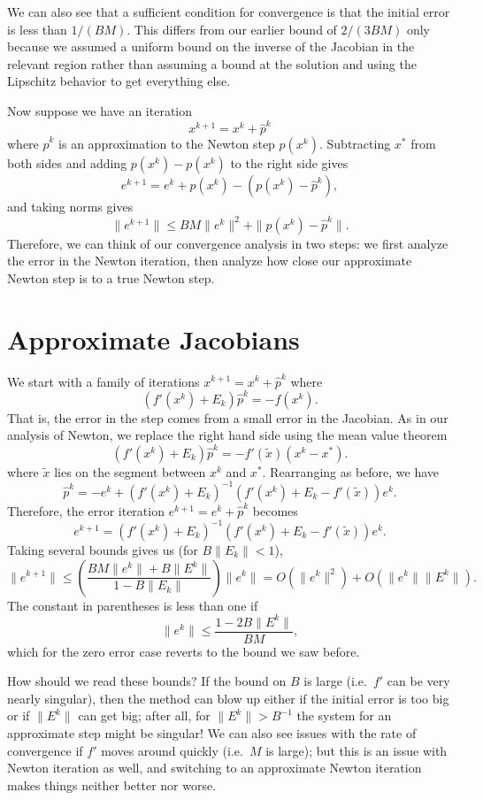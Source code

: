\documentclass[12pt, leqno]{article} %
\begin{document}
We can also see that a sufficient condition for convergence is that
the initial error is less than $1/(BM)$.  This differs from our
earlier bound of $2/(3BM)$ only because we assumed a uniform bound on
the inverse of the Jacobian in the relevant region rather than
assuming a bound at the solution and using the Lipschitz behavior to
get everything else.

Now suppose we have an iteration
\[
  x^{k+1} = x^k + \hat{p}^k
\]
where $\hat{p}^k$ is an approximation to the Newton step $p(x^k)$.
Subtracting $x^*$ from both sides and adding $p(x^k)-p(x^k)$ to the
right side gives
\[
  e^{k+1} = e^k + p(x^k) - (p(x^k)-\hat{p}^k),
\]
and taking norms gives
\[
  \|e^{k+1}\| \leq BM \|e^k\|^2 + \|p(x^k)-\hat{p}^k\|.
\]
Therefore, we can think of our convergence analysis in two steps:
we first analyze the error in the Newton iteration, then analyze
how close our approximate Newton step is to a true Newton step.

\section{Approximate Jacobians}

We start with a family of iterations $x^{k+1} = x^k + \hat{p}^k$ where
\[
  (f'(x^k)+E_k) \hat{p}^k = -f(x^k).
\]
That is, the error in the step comes from a small error in the
Jacobian.  As in our analysis of Newton, we replace the right hand
side using the mean value theorem
\[
  (f'(x^k)+E_k) \hat{p}^k = -f'(\tilde{x})(x^k-x^*).  
\]
where $\tilde{x}$ lies on the segment between $x^k$ and $x^*$.
Rearranging as before, we have
\[
  \hat{p}^k =
    -e^k +
    \left( f'(x^k)+E_k \right)^{-1}
    \left(f'(x^k) + E_k - f'(\tilde{x}) \right) e^k.
\]
Therefore, the error iteration $e^{k+1} = e^k + \hat{p}^k$ becomes
\[
  e^{k+1} =
    \left( f'(x^k)+E_k \right)^{-1}
    \left(f'(x^k) + E_k - f'(\tilde{x}) \right) e^k.
\]
Taking several bounds gives us (for $B \|E_k\| < 1$),
\[
  \|e^{k+1}\| \leq \left( \frac{BM\|e^k\| + B\|E^k\|}{1-B\|E_k\|} \right) \|e^k\|
  = O(\|e^k\|^2) + O(\|e^k\| \|E^k\|).
\]
The constant in parentheses is less than one if
\[
  \|e^k\| \leq \frac{1-2B\|E^k\|}{BM},
\]
which for the zero error case reverts to the bound we saw before.

How should we read these bounds?  If the bound on $B$ is large
(i.e.~$f'$ can be very nearly singular), then the method can blow up
either if the initial error is too big or if $\|E^k\|$ can get big;
after all, for $\|E^k\| > B^{-1}$ the system for an approximate step
might be singular!  We can also see issues with the rate of
convergence if $f'$ moves around quickly (i.e.~$M$ is large);
but this is an issue with Newton iteration as well, and switching to
an approximate Newton iteration makes things neither better nor worse.
\end{document}
